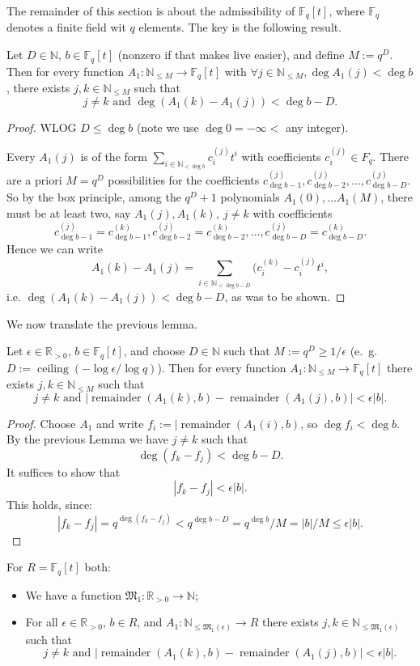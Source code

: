 \documentclass{amsart}
\newcommand{\N}{\mathbb{N}}
\newcommand{\R}{\mathbb{R}}
\newcommand{\F}{\mathbb{F}}
\newcommand{\M}{\mathfrak{M}}
\newcommand{\remainder}{\operatorname{remainder}}
\begin{document}
The remainder of this section is about the admissibility of $\F_q[t]$, where $\F_q$ denotes a finite field wit $q$ elements.
The key is the following result.

\begin{lemma}
Let $D \in \N$, $b \in \F_q[t]$ (nonzero if that makes live easier), and define $M:=q^D$. Then for every function
$A_1: \N_{\leq M} \to \F_q[t]$ with $\forall j \in  \N_{\leq M}, \deg A_1(j) < \deg b$, there exists $j,k \in \N_{\leq M}$ such that
\[j \neq k \text{ and } \deg(A_1(k)-A_1(j)) < \deg b-D.\]
\end{lemma}

\begin{proof}
WLOG $D \leq \deg b$ (note we use $\deg 0 = -\infty < $ any integer).

Every $A_1(j)$ is of the form $\sum_{i \in \N_{< \deg b}} c_i^{(j)} t^i$ with coefficients $c_i^{(j)} \in F_q$.
There are a priori $M=q^D$ possibilities for the coefficients $c_{\deg b-1}^{(j)}, c_{\deg b-2}^{(j)},\ldots, c_{\deg b-D}^{(j)}$.
So by the box principle, among the $q^D+1$ polynomials $A_1(0), \ldots A_1(M)$, there must be at least two, say $A_1(j), A_1(k),\ j\not=k$ with coefficients 
\[c_{\deg b-1}^{(j)}=c_{\deg b-1}^{(k)}, c_{\deg b-2}^{(j)}= c_{\deg b-2}^{(k)},\ldots, c_{\deg b-D}^{(j)}= c_{\deg b-D}^{(k)}.\] Hence we can write
 \[A_1(k)-A_1(j)=\sum_{i \in \N_{<\deg b-D}} (c_i^{(k)}-c_i^{(j)} t^i,\]
i.e. $\deg (A_1(k)-A_1(j))<\deg b-D$, as was to be shown.
\end{proof}

We now translate the previous lemma.
\begin{lemma}
Let $\epsilon \in \R_{>0}$, $b \in \F_q[t]$, and choose $D \in \N$ such that $M:=q^D\geq 1/\epsilon$ (e.~g.~ $D:=\operatorname{ceiling} (-\log \epsilon/\log q)$).
Then for every function
$A_1: \N_{\leq M} \to \F_q[t]$ there exists $j,k \in \N_{\leq M}$ such that
\[j \neq k \text{ and } |\remainder(A_1(k),b)-\remainder(A_1(j),b)| < \epsilon |b|.\]
\end{lemma}

\begin{proof}
Choose $A_1$ and write $f_i:= |\remainder(A_1(i),b)$, so $\deg f_i < \deg b$. By the previous Lemma we have $j\not=k$ such that
\[\deg (f_k-f_j) <\deg b -D.\]
It suffices to show that
\[|f_k-f_j| <\epsilon |b|.\]
This holds, since:
\[ |f_k-f_j|=q^{\deg(f_k-f_j)}<q^{\deg b -D}=q^{\deg b}/M=|b|/M\leq \epsilon |b|.\]
\end{proof}


\begin{lemma}\label{lem admissible 1D}
For $R=\F_q[t]$ both:
\begin{itemize}
\item We have a function $\M_1 : \R_{>0} \to \N$;
\item For all $ \epsilon \in \R_{>0}$, $b \in R$, and $A_1: \N_{\leq \M_1(\epsilon)} \to R$ there exists $j,k \in \N_{\leq \M_1(\epsilon)}$ such that
\[j \neq k \text{ and } |\remainder(A_1(k),b)-\remainder(A_1(j),b)| < \epsilon |b|.\]
\end{itemize}
\end{lemma}
\end{document}
